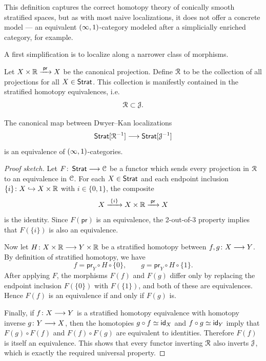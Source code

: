 \begin{observation}
This definition captures the correct homotopy theory of conically smooth stratified spaces, but as with most naive localizations, it does not offer a concrete model — an equivalent $(\operatorname{\infty},1)$-category modeled after a simplicially enriched category, for example.   
\end{observation}

A first simplification is to localize along a narrower class of morphisms.

\begin{definition}
    Let $X \times \mathbb R \xrightarrow{\; \mathsf{pr}\;} X$ be the canonical projection. Define $\mathcal R$ to be the collection of all projections for all $X\in \operatorname{\mathsf{Strat}}$. This collection is manifestly contained in the stratified homotopy equivalences, i.e.
        \begin{equation}
        \mathcal R \subset \mathcal J.
        \end{equation}   
\end{definition}

\begin{lemma}\cite[Lemma~2.1.7]{AFR1}
    The canonical map between Dwyer--Kan localizations 
    \begin{equation}
        \operatorname{\mathsf{Strat}}[\mathcal R^{-1}] \longrightarrow \operatorname{\mathsf{Strat}}[\mathcal J^{-1}]
    \end{equation}
    is an equivalence of $(\operatorname{\infty},1)$-categories.
\end{lemma}
\begin{proof}[Proof sketch]
    Let $F \colon \operatorname{\mathsf{Strat}} \longrightarrow \mathcal C$ be a functor which sends every projection in $\mathcal R$ to an equivalence in $\mathcal C$. For each $X\in \operatorname{\mathsf{Strat}}$ and each endpoint inclusion $\{i\}\colon X \hookrightarrow X\times \mathbb R$ with $i\in \{0,1\}$, the composite
    \begin{equation}
        X \xrightarrow{\;\{i\}\;} X\times \mathbb R \xrightarrow{\;\mathsf{pr}\;} X
    \end{equation}
    is the identity. Since $F(\mathsf{pr})$ is an equivalence, the 2-out-of-3 property implies that $F(\{i\})$ is also an equivalence.

    Now let $H\colon X\times \mathbb R \longrightarrow Y\times \mathbb R$ be a stratified homotopy between $f,g\colon X\longrightarrow Y$. By definition of stratified homotopy, we have
    \begin{equation}
        f = \mathsf{pr}_Y \circ H \circ \{0\}, \qquad g = \mathsf{pr}_Y \circ H \circ \{1\}.
    \end{equation}
    After applying $F$, the morphisms $F(f)$ and $F(g)$ differ only by replacing the endpoint inclusion $F(\{0\})$ with $F(\{1\})$, and both of these are equivalences. Hence $F(f)$ is an equivalence if and only if $F(g)$ is.

    Finally, if $f\colon X\longrightarrow Y$ is a stratified homotopy equivalence with homotopy inverse $g\colon Y\longrightarrow X$, then the homotopies $g\circ f \simeq \operatorname{\sf id}_X$ and $f\circ g \simeq \operatorname{\sf id}_Y$ imply that $F(g)\circ F(f)$ and $F(f)\circ F(g)$ are equivalent to identities. Therefore $F(f)$ is itself an equivalence. This shows that every functor inverting $\mathcal R$ also inverts $\mathcal J$, which is exactly the required universal property.
\end{proof}

